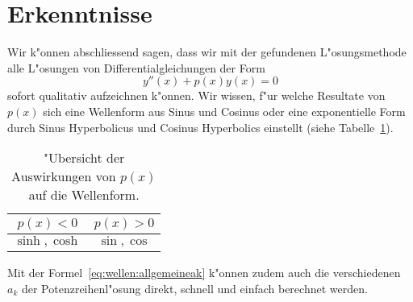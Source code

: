 \section{Erkenntnisse}
Wir k"onnen abschliessend sagen, dass wir mit der gefundenen L"osungsmethode 
alle L"osungen von Differentialgleichungen der Form 
\begin{equation*}
	y''(x)+p(x)y(x) = 0
\end{equation*}
sofort qualitativ aufzeichnen k"onnen.
%
Wir wissen, f"ur welche Resultate von 
$p(x)$ sich eine Wellenform aus Sinus und Cosinus oder eine exponentielle Form 
durch Sinus Hyperbolicus und Cosinus Hyperbolics einstellt (siehe 
Tabelle~\ref{tab:wellen:formoverview}).
\begin{table}
	\centering
	\begin{tabular}{ c | c }
		$p(x) < 0$ & $p(x) > 0$ \\\hline
		$\sinh, \cosh$ & $\sin, \cos$
	\end{tabular}
	\caption{"Ubersicht der Auswirkungen von $p(x)$ auf die Wellenform.}
	\label{tab:wellen:formoverview}
\end{table}
Mit der Formel~\eqref{eq:wellen:allgemeineak} k"onnen zudem auch die 
verschiedenen $a_k$ der Potenzreihenl"osung direkt, schnell und einfach 
berechnet werden.
